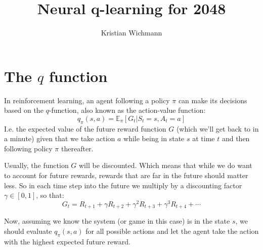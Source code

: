 \documentclass[12pt, a4paper]{article}
\title{Neural q-learning for 2048}
\author{Kristian Wichmann}
\numberwithin{equation}{section}
\begin{document}
\maketitle

\section{The $q$ function}
In reinforcement learning, an agent following a policy $\pi$ can make its decisions based on the $q$-function, also known as the action-value function:
\begin{equation}
q_\pi(s,a)=\mathbb{E}_\pi[G_t|S_t=s,A_t=a]
\end{equation}
I.e. the expected value of the future reward function $G$ (which we'll get back to in a minute) given that we take action $a$ while being in state $s$ at time $t$ and then following policy $\pi$ thereafter.

Usually, the function $G$ will be discounted. Which means that while we do want to account for future rewards, rewards that are far in the future should matter less. So in each time step into the future we multiply by a discounting factor $\gamma\in[0,1]$, so that:
\begin{equation}
G_t=R_{t+1}+\gamma R_{t+2}+\gamma^2 R_{t+3}+\gamma^3 R_{t+4}+\cdots
\end{equation}

Now, assuming we know the system (or game in this case) is in the state $s$, we should evaluate $q_\pi(s,a)$ for all possible actions and let the agent take the action with the highest expected future reward.
\end{document}
